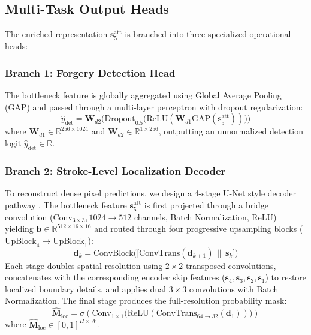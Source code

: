 \documentclass[pdflatex,sn-mathphys-num,iicol]{sn-jnl}
\begin{document}
\subsection{Multi-Task Output Heads}\label{subsec4_4}
The enriched representation $\mathbf{s}_5^{\text{att}}$ is branched into three specialized operational heads:

\subsubsection{Branch 1: Forgery Detection Head}
The bottleneck feature is globally aggregated using Global Average Pooling (GAP) and passed through a multi-layer perceptron with dropout regularization:
\begin{equation}
\hat{y}_{\text{det}} = \mathbf{W}_{d2} \Big(\text{Dropout}_{0.5}\big(\text{ReLU}(\mathbf{W}_{d1} \text{GAP}(\mathbf{s}_5^{\text{att}}))\big)\Big)\label{eq_det_head}
\end{equation}
where $\mathbf{W}_{d1} \in \mathbb{R}^{256 \times 1024}$ and $\mathbf{W}_{d2} \in \mathbb{R}^{1 \times 256}$, outputting an unnormalized detection logit $\hat{y}_{\text{det}} \in \mathbb{R}$.

\subsubsection{Branch 2: Stroke-Level Localization Decoder}
To reconstruct dense pixel predictions, we design a 4-stage U-Net style decoder pathway \cite{bib6}. The bottleneck feature $\mathbf{s}_5^{\text{att}}$ is first projected through a bridge convolution ($\text{Conv}_{3 \times 3}, 1024 \rightarrow 512$ channels, Batch Normalization, ReLU) yielding $\mathbf{b} \in \mathbb{R}^{512 \times 16 \times 16}$ and routed through four progressive upsampling blocks ($\text{UpBlock}_4 \rightarrow \text{UpBlock}_1$):
\begin{equation}
\mathbf{d}_k = \text{ConvBlock}\Big(\big[\text{ConvTrans}(\mathbf{d}_{k+1}) \,\|\, \mathbf{s}_k\big]\Big)\label{eq_upblock}
\end{equation}
Each stage doubles spatial resolution using $2 \times 2$ transposed convolutions, concatenates with the corresponding encoder skip features ($\mathbf{s}_4, \mathbf{s}_3, \mathbf{s}_2, \mathbf{s}_1$) to restore localized boundary details, and applies dual $3 \times 3$ convolutions with Batch Normalization. The final stage produces the full-resolution probability mask:
\begin{equation}
\hat{\mathbf{M}}_{\text{loc}} = \sigma\left(\text{Conv}_{1 \times 1}\big(\text{ReLU}(\text{ConvTrans}_{64 \rightarrow 32}(\mathbf{d}_1))\big)\right)\label{eq_seg_head}
\end{equation}
where $\hat{\mathbf{M}}_{\text{loc}} \in [0, 1]^{H \times W}$.
\end{document}

